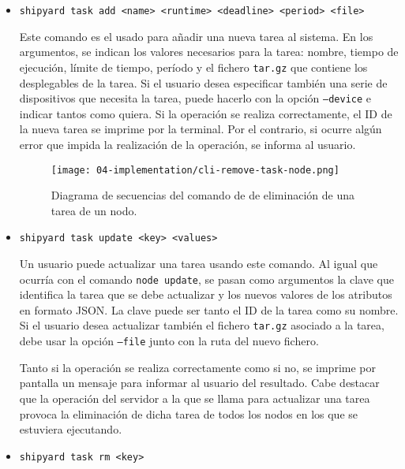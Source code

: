 \begin{itemize}
    \item \lstinline{shipyard task add <name> <runtime> <deadline> <period> <file>}

          Este comando es el usado para añadir una nueva tarea al sistema. En los
          argumentos, se indican los valores necesarios para la tarea: nombre,
          tiempo de ejecución, límite de tiempo, período y el fichero
          \texttt{tar.gz} que contiene los desplegables de la tarea. Si el usuario
          desea especificar también una serie de dispositivos que necesita la
          tarea, puede hacerlo con la opción \texttt{--device} e indicar tantos
          como quiera. Si la operación se realiza correctamente, el ID de la nueva
          tarea se imprime por la terminal. Por el contrario, si ocurre algún
          error que impida la realización de la operación, se informa al
          usuario.

          \begin{figure}
              \centering
              \texttt{[image: 04-implementation/cli-remove-task-node.png]}
              \caption{Diagrama de secuencias del comando de de eliminación de una tarea de un nodo.}
              \label{fig:04-cli_remove_task_node}
          \end{figure}

    \item \lstinline{shipyard task update <key> <values>}

          Un usuario puede actualizar una tarea usando este comando. Al igual que
          ocurría con el comando \lstinline{node update}, se pasan como argumentos
          la clave que identifica la tarea que se debe actualizar y los nuevos
          valores de los atributos en formato JSON. La clave puede ser tanto el ID
          de la tarea como su nombre. Si el usuario desea actualizar también el
          fichero \texttt{tar.gz} asociado a la tarea, debe usar la opción
          \texttt{--file} junto con la ruta del nuevo fichero.

          Tanto si la operación se realiza correctamente como si no, se imprime
          por pantalla un mensaje para informar al usuario del resultado. Cabe
          destacar que la operación del servidor a la que se llama para actualizar
          una tarea provoca la eliminación de dicha tarea de todos los nodos en
          los que se estuviera ejecutando.

    \item \lstinline{shipyard task rm <key>}


\end{itemize}
